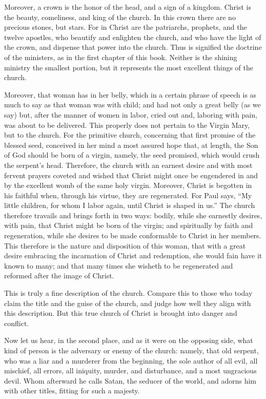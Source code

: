 Moreover, a crown is the honor of the head, and a sign of a kingdom. Christ is the beauty, comeliness, and king of the church. In this crown there are no precious stones, but stars. For in Christ are the patriarchs, prophets, and the twelve apostles, who beautify and enlighten the church, and who have the light of the crown, and dispense that power into the church. Thus is signified the doctrine of the ministers, as in the first chapter of this book. Neither is the shining ministry the smallest portion, but it represents the most excellent things of the church.

Moreover, that woman has in her belly, which in a certain phrase of speech is as much to say as that woman was with child; and had not only a great belly (as we say) but, after the manner of women in labor, cried out and, laboring with pain, was about to be delivered. This properly does not pertain to the Virgin Mary, but to the church. For the primitive church, concerning that first promise of the blessed seed, conceived in her mind a most assured hope that, at length, the Son of God should be born of a virgin, namely, the seed promised, which would crush the serpent’s head. Therefore, the church with an earnest desire and with most fervent prayers coveted and wished that Christ might once be engendered in and by the excellent womb of the same holy virgin. Moreover, Christ is begotten in his faithful when, through his virtue, they are regenerated. For Paul says, “My little children, for whom I labor again, until Christ is shaped in us.” The church therefore travails and brings forth in two ways: bodily, while she earnestly desires, with pain, that Christ might be born of the virgin; and spiritually by faith and regeneration, while she desires to be made conformable to Christ in her members. This therefore is the nature and disposition of this woman, that with a great desire embracing the incarnation of Christ and redemption, she would fain have it known to many; and that many times she wisheth to be regenerated and reformed after the image of Christ.

This is truly a fine description of the church. Compare this to those who today claim the title and the guise of the church, and judge how well they align with this description. But this true church of Christ is brought into danger and conflict.

Now let us hear, in the second place, and as it were on the opposing side, what kind of person is the adversary or enemy of the church: namely, that old serpent, who was a liar and a murderer from the beginning, the sole author of all evil, all mischief, all errors, all iniquity, murder, and disturbance, and a most ungracious devil. Whom afterward he calls Satan, the seducer of the world, and adorns him with other titles, fitting for such a majesty.

